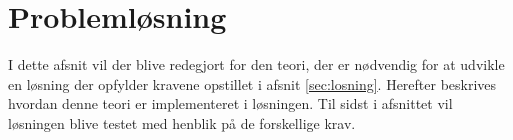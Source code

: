 \section{Problemløsning}
\label{sec:problemlosning}
I dette afsnit vil der blive redegjort for den teori, der er nødvendig for at udvikle en løsning der opfylder kravene opstillet i afsnit \ref{sec:losning}. Herefter beskrives hvordan denne teori er implementeret i løsningen. Til sidst i afsnittet vil løsningen blive testet med henblik på de forskellige krav.


\clearpage

\clearpage



\clearpage